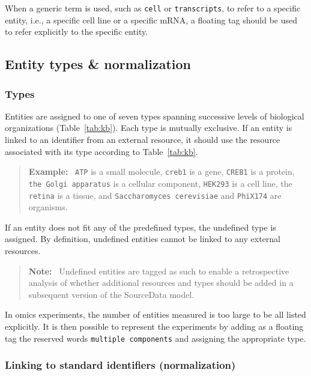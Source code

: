 \documentclass{bioinfo}
\newenvironment{note}
{\par\color{black}\begin{quote}\textbf{Note:}\ }
{\end{quote}\par}
\newenvironment{example}
{\par\color{black}\begin{quote}\textbf{Example:}\ }
{\end{quote}\par}
\begin{document}
When a generic term is used, such as \texttt{cell} or \texttt{transcripts}, to refer to a specific entity, i.e., a specific cell line or a specific mRNA, a floating tag should be used to refer explicitly to the specific entity.

\subsection{Entity types \& normalization}\label{app:entity-types-normalization}

\subsubsection{Types}\label{app:types}

Entities are assigned to one of seven types spanning successive levels of biological organizations (Table~\ref{tab:kb}). Each type is mutually exclusive. If an entity is linked to an identifier from an external resource, it should use the resource associated with its type according to Table~\ref{tab:kb}.

\begin{example}
    \texttt{ATP} is a small molecule, \texttt{creb1} is a gene, \texttt{CREB1} is a protein, \texttt{the Golgi apparatus} is a cellular component, \texttt{HEK293} is a cell line, the \texttt{retina} is a tissue, and \texttt{Saccharomyces cerevisiae} and \texttt{PhiX174} are organisms.
\end{example}

If an entity does not fit any of the predefined types, the undefined type is assigned. By definition, undefined entities cannot be linked to any external resources.

\begin{note}
    Undefined entities are tagged as such to enable a retrospective analysis of whether additional resources and types should be added in a subsequent version of the SourceData model.
\end{note}

In omics experiments, the number of entities measured is too large to be all listed explicitly. It is then possible to represent the experiments by adding as a floating tag the reserved words \texttt{multiple components} and assigning the appropriate type.

\subsubsection{Linking to standard identifiers (normalization)}\label{app:linking}
\end{document}
